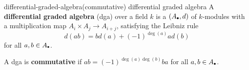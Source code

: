 
\begin{topic}{differential-graded-algebra}{(commutative) differential graded algebra}
    A \textbf{differential graded algebra} (dga) over a field $k$ is a  $(A_\bdot, d)$ of $k$-modules with a multiplication map $A_i \times A_j \to A_{i + j}$, satisfying the Leibniz rule
    \[ d(ab) = b d(a) + (-1)^{\deg(a)} a d(b) \]
    for all $a, b \in A_\bdot$.
    
    A dga is \textbf{commutative} if $ab = (-1)^{\deg(a) \deg(b)} ba$ for all $a, b \in A_\bdot$.
\end{topic}
